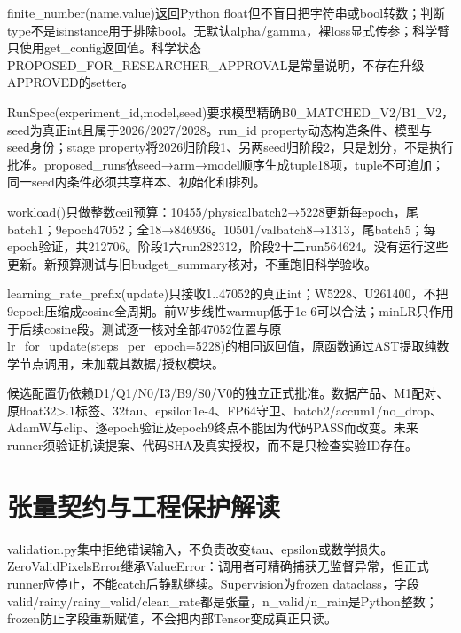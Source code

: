 \documentclass[UTF8,fontset=fandol,10pt]{ctexart}
\begin{document}
finite\_\allowbreak{}number(name,value)返回Python float但不盲目把字符串或bool转数；判断type不是isinstance用于排除bool。无默认alpha/\allowbreak{}gamma，裸loss显式传参；科学臂只使用get\_\allowbreak{}config返回值。科学状态PROPOSED\_\allowbreak{}FOR\_\allowbreak{}RESEARCHER\_\allowbreak{}APPROVAL是常量说明，不存在升级APPROVED的setter。

RunSpec(experiment\_\allowbreak{}id,model,seed)要求模型精确B0\_\allowbreak{}MATCHED\_\allowbreak{}V2/\allowbreak{}B1\_\allowbreak{}V2，seed为真正int且属于2026/\allowbreak{}2027/\allowbreak{}2028。run\_\allowbreak{}id property动态构造条件、模型与seed身份；stage property将2026归阶段1、另两seed归阶段2，只是划分，不是执行批准。proposed\_\allowbreak{}runs依seed→arm→model顺序生成tuple18项，tuple不可追加；同一seed内条件必须共享样本、初始化和排列。

workload()只做整数ceil预算：10455/\allowbreak{}physicalbatch2→5228更新每epoch，尾batch1；9epoch47052；全18→846936。10501/\allowbreak{}valbatch8→1313，尾batch5；每epoch验证，共212706。阶段1六run282312，阶段2十二run564624。没有运行这些更新。新预算测试与旧budget\_\allowbreak{}summary核对，不重跑旧科学验收。

learning\_\allowbreak{}rate\_\allowbreak{}prefix(update)只接收1..47052的真正int；W5228、U261400，不把9epoch压缩成cosine全周期。前W步线性warmup低于1e-6可以合法；minLR只作用于后续cosine段。测试逐一核对全部47052位置与原lr\_\allowbreak{}for\_\allowbreak{}update(steps\_\allowbreak{}per\_\allowbreak{}epoch=5228)的相同返回值，原函数通过AST提取纯数学节点调用，未加载其数据/\allowbreak{}授权模块。

候选配置仍依赖D1/\allowbreak{}Q1/\allowbreak{}N0/\allowbreak{}I3/\allowbreak{}B9/\allowbreak{}S0/\allowbreak{}V0的独立正式批准。数据产品、M1配对、原float32>.1标签、32tau、epsilon1e-4、FP64守卫、batch2/\allowbreak{}accum1/\allowbreak{}no\_\allowbreak{}drop、AdamW与clip、逐epoch验证及epoch9终点不能因为代码PASS而改变。未来runner须验证机读提案、代码SHA及真实授权，而不是只检查实验ID存在。
\clearpage\section{张量契约与工程保护解读}

validation.py集中拒绝错误输入，不负责改变tau、epsilon或数学损失。ZeroValidPixelsError继承ValueError：调用者可精确捕获无监督异常，但正式runner应停止，不能catch后静默继续。Supervision为frozen dataclass，字段valid/\allowbreak{}rainy/\allowbreak{}rainy\_\allowbreak{}valid/\allowbreak{}clean\_\allowbreak{}rate都是张量，n\_\allowbreak{}valid/\allowbreak{}n\_\allowbreak{}rain是Python整数；frozen防止字段重新赋值，不会把内部Tensor变成真正只读。
\end{document}
